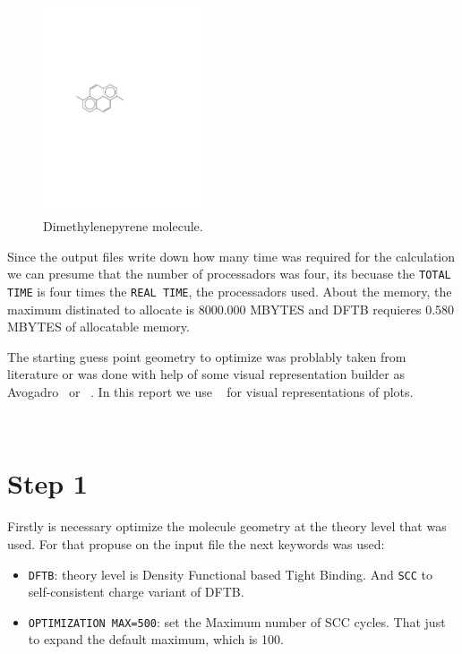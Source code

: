 \begin{figure}
    \centering
    \includegraphics[width=0.42\textwidth]{./img/dimetil}
    \caption{Dimethylenepyrene molecule.}
\label{dimethylenepyrene}
\end{figure}

Since the output files write down how many time was required for the
calculation we can presume that the number of processadors was four, its
becuase the \texttt{TOTAL TIME} is four times the \texttt{REAL TIME}, the
processadors used. About the memory, the maximum distinated to allocate is
8000.000 MBYTES and DFTB requieres 0.580 MBYTES of allocatable memory.

The starting guess point geometry to optimize was problably taken from
literature or was done with help of some visual representation builder as
Avogadro~\cite{Hanwell2012} or {}~\cite{g16}. In this report we use
{}~\cite{gnuplot} for visual representations of plots.

$\,$

\section{\textbf{Step 1}}

Firstly is necessary optimize the molecule geometry at the theory
level that was used. For that propuse on the input file
the next keywords was used:

\begin{itemize}
\item \texttt{DFTB}: theory level is Density Functional based Tight Binding. And \texttt{SCC} to
self-consistent charge variant of DFTB.

\item \texttt{OPTIMIZATION MAX=500}: set the Maximum number of SCC cycles. That just to
expand the default maximum, which is 100.
\end{itemize}

